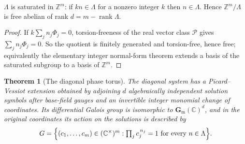 \documentclass[11pt,letterpaper]{article}
\numberwithin{equation}{section}
\newtheorem{theorem}{Theorem}[section]
\theoremstyle{definition}
\theoremstyle{remark}
\newcommand{\C}{\mathbb C}
\newcommand{\Z}{\mathbb Z}
\newcommand{\Pcl}{\mathcal P}
\newcommand{\gm}{\mathbf G_{\mathrm m}}
\begin{document}
\begin{lemma}
\label{diff:lem:saturated}
$\Lambda$ is saturated in $\Z^{m}$: if $kn\in\Lambda$ for a nonzero integer
$k$ then $n\in\Lambda$. Hence $\Z^{m}/\Lambda$ is free abelian of rank
$d=m-\operatorname{rank}\Lambda$.
\end{lemma}
\begin{proof}
If $k\sum_{j}n_{j}\Phi_{j}=0$, torsion-freeness of the real vector class $\Pcl$
gives $\sum_{j}n_{j}\Phi_{j}=0$. So the quotient is finitely generated and
torsion-free, hence free; equivalently the elementary integer normal-form
theorem extends a basis of the saturated subgroup to a basis of $\Z^{m}$.
\end{proof}

\begin{theorem}[The diagonal phase torus]
\label{diff:thm:torus}
The diagonal system has a Picard--Vessiot extension obtained by adjoining $d$
algebraically independent solution symbols after base-field gauges and an
invertible integer monomial change of coordinates. Its differential Galois
group is isomorphic to $\gm(\C)^{d}$, and in the original coordinates its
action on the solutions is described by
\begin{equation}\label{diff:eq:torus}
 G=\Bigl\{(c_{1},\dots,c_{m})\in(\C^{\times})^{m}:
 \textstyle\prod_{j}c_{j}^{\,n_{j}}=1
 \ \text{for every }n\in\Lambda\Bigr\}.
\end{equation}
\end{theorem}
\end{document}
